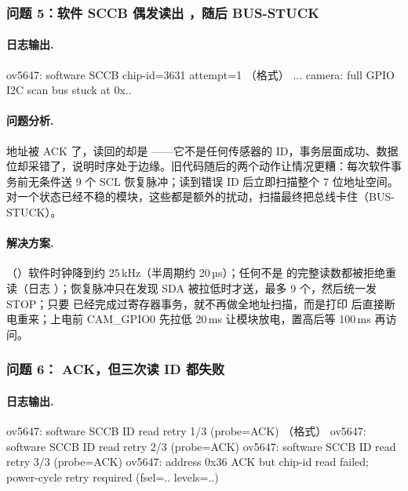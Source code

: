 \subsubsection{问题 5：软件 SCCB 偶发读出 ，随后 BUS-STUCK}

\paragraph{日志输出.}
\begin{txtcode}
ov5647: software SCCB chip-id=3631 attempt=1                   （格式）
...
camera: full GPIO I2C scan bus stuck at 0x..
\end{txtcode}

\paragraph{问题分析.} 地址被 ACK 了，读回的却是 ——它不是任何传感器的 ID，事务层面成功、数据位却采错了，说明时序处于边缘。旧代码随后的两个动作让情况更糟：每次软件事务前无条件送 9 个 SCL 恢复脉冲；读到错误 ID 后立即扫描整个 7 位地址空间。对一个状态已经不稳的模块，这些都是额外的扰动，扫描最终把总线卡住（BUS-STUCK）。

\paragraph{解决方案.}（）软件时钟降到约 25\,kHz（半周期约 20\,µs）；任何不是  的完整读数都被拒绝重读（日志 ）；恢复脉冲只在发现 SDA 被拉低时才送，最多 9 个，然后统一发 STOP；只要  已经完成过寄存器事务，就不再做全地址扫描，而是打印  后直接断电重来；上电前 CAM\_GPIO0 先拉低 20\,ms 让模块放电，置高后等 100\,ms 再访问。

\subsubsection{问题 6： ACK，但三次读 ID 都失败}

\paragraph{日志输出.}
\begin{txtcode}
ov5647: software SCCB ID read retry 1/3 (probe=ACK)            （格式）
ov5647: software SCCB ID read retry 2/3 (probe=ACK)
ov5647: software SCCB ID read retry 3/3 (probe=ACK)
ov5647: address 0x36 ACK but chip-id read failed; power-cycle retry required (fsel=.. levels=..)
\end{txtcode}

